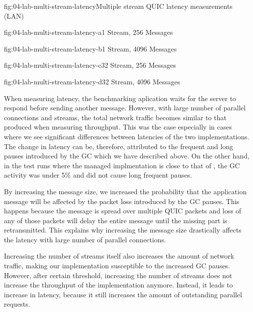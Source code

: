 \begin{myFigure}{fig:04-lab-multi-stream-latency}{Multiple stream QUIC latency measurements (LAN)}
\begin{mySubfigure}{0.49\linewidth}{fig:04-lab-multi-stream-latency-a}{1 Stream, \SI{256}{\byte} Messages}
\footnotesize

\end{mySubfigure}
\begin{mySubfigure}{0.49\linewidth}{fig:04-lab-multi-stream-latency-b}{1 Stream, \SI{4096}{\byte} Messages}
\footnotesize

\end{mySubfigure}

\begin{mySubfigure}{0.49\linewidth}{fig:04-lab-multi-stream-latency-c}{32 Stream, \SI{256}{\byte} Messages}
\footnotesize

\end{mySubfigure}
\begin{mySubfigure}{0.49\linewidth}{fig:04-lab-multi-stream-latency-d}{32 Stream, \SI{4096}{\byte} Messages}
\footnotesize

\end{mySubfigure}
\end{myFigure}

When measuring latency, the benchmarking aplication waits for the server to respond before sending
another message. However, with large number of parallel connections and streams, the total network
traffic becomes similar to that produced when measuring throughput. This was the case especially in
cases where we see significant differences between latencies of the two implementations. The change
in latency can be, therefore, attributed to the frequent and long pauses introduced by the GC which
we have described above. On the other hand, in the test runs where the managed implmentation is
close to that of \libmsquic{}, the GC activity was under 5\% and did not cause long frequent pauses.

By increasing the message size, we increased the probability that the application message will be
affected by the packet loss introduced by the GC pauses. This happens because the message is spread
over multiple QUIC packets and loss of any of those packets will delay the entire message until the
missing part is retransmitted. This explains why increasing the message size drastically affects the
latency with large number of parallel connections.

Increasing the number of streams itself also increases the amount of network traffic, making our
implementation susceptible to the increased GC pauses. However, after certain threshold, increasing
the number of streams does not increase the throughput of the implementation anymore. Instead, it
leads to increase in latency, because it still increases the amount of outstanding parallel
requests.

